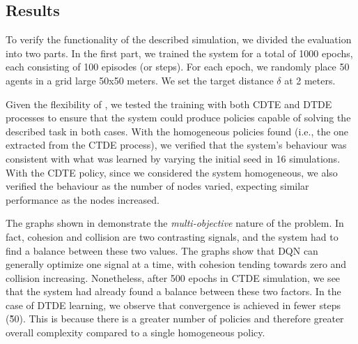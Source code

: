 \subsection{Results}
To verify the functionality of the described simulation, 
 we divided the evaluation into two parts. 
%
In the first part, 
 we trained the system for a total of 1000 epochs, 
 each consisting of 100 episodes (or steps). 
%
For each epoch,
 we randomly place 50 agents in a grid large 50x50 meters.
 We set the target distance $\delta$ at 2 meters.

Given the flexibility of \scarlib{}, 
 we tested the training with both CDTE and DTDE processes 
 to ensure that the system could produce policies 
 capable of solving the described task in both cases. 
% 
With the homogeneous policies found (i.e., the one extracted from the CTDE process), 
 we verified that the system's behaviour 
 was consistent with what was learned by varying the initial seed 
 in 16 simulations.
%
With the CDTE policy, 
 since we considered the system homogeneous, 
 we also verified the behaviour as the number of nodes varied,
 expecting similar performance as the nodes increased.

The graphs shown in  
 demonstrate the \emph{multi-objective} nature of the problem. 
In fact, cohesion and collision are two contrasting signals, 
 and the system had to find a balance between these two values. 
 The graphs show that DQN can generally optimize one signal at a time, 
 with cohesion tending towards zero and collision increasing. 
% 
Nonetheless, after 500 epochs in CTDE simulation,  
 we see that the system had already found a balance between these two factors.
%
In the case of DTDE learning, 
 we observe that convergence is achieved in fewer steps (\~ 50). 
 This is because there is a greater number of policies and 
 therefore greater overall complexity compared to a single homogeneous policy.


